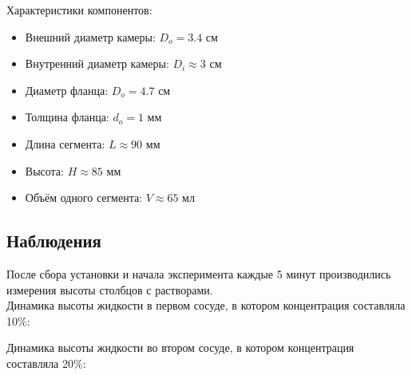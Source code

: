 \documentclass{article}
\begin{document}
            Характеристики компонентов:

            \begin{itemize}
                \item Внешний диаметр камеры: $D_o = 3.4$ см
                \item Внутренний диаметр камеры: $D_i \approx 3$ см
                \item Диаметр фланца: $D_o = 4.7$ см
                \item Толщина фланца: $d_o = 1$ мм
                \item Длина сегмента: $L \approx 90$ мм
                \item Высота: $H \approx 85$ мм
                \item Объём одного сегмента: $V \approx 65$ мл
            \end{itemize}
            \newpage

        \subsection*{Наблюдения}
            \hspace*{4mm}После сбора установки и начала эксперимента каждые 5 минут производились измерения высоты
            столбцов с растворами. \\

            Динамика высоты жидкости в первом сосуде, в котором концентрация составляла 10\%:
            \vspace*{8mm}

            \newpage

            Динамика высоты жидкости во втором сосуде, в котором концентрация составляла 20\%:
            \vspace*{8mm}
\end{document}
